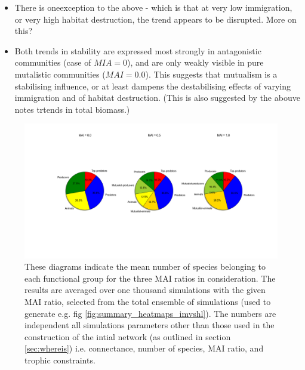 \begin{itemize}
	\item There is oneexception to the above - which is that at very low immigration, or very high habitat destruction, the trend appears to be disrupted. More on this? 
	
	\item Both trends in stability are expressed most strongly in antagonistic communities (case of $MIA=0$), and are only weakly visible in pure mutalistic communities ($MAI=0.0$). This suggests that mutualism is a stabilising influence, or at least dampens the destabilising effects of varying immigration and of habitat destruction. (This is also suggested by the abouve notes trtends in total biomass.)
	
\end{itemize}



\begin{figure}
	\hspace{-2.5cm}
	\includegraphics[width=1.3\linewidth]{"./chapters/chapter04/figures/init_proportions"}
	\caption{These diagrams indicate the mean number of species belonging to each functional group for the three MAI ratios in consideration. The results are averaged over one thousand simulations with the given MAI ratio, selected from the total ensemble of simulations (used to generate e.g. fig \ref{fig:summary_heatmaps_imvshl}). The numbers are independent all simulations parameters other than those used in the construction of the intial network (as outlined in section \ref{sec:whereis}) i.e. connectance, number of species, MAI ratio, and trophic constraints. }
	\label{fig:initial_proportions}
\end{figure}


